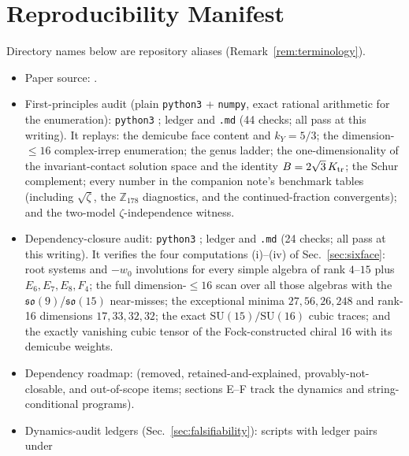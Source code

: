 \documentclass[
  aps,
  prd,
  preprint,
  nofootinbib,
  superscriptaddress,
  longbibliography
]{revtex4-2}
\newcommand{\SU}{\mathrm{SU}}
\begin{document}
\section{Reproducibility Manifest}
\label{sec:manifest}

Directory names below are repository aliases (Remark~\ref{rem:terminology}).

\begin{itemize}
\item Paper source: .
\item First-principles audit (plain \texttt{python3} + \texttt{numpy},
  exact rational arithmetic for the enumeration):
  \texttt{python3} ;
  ledger  and
  \texttt{.md} (44 checks; all pass at this writing).  It replays: the
  demicube face content and \(k_Y=5/3\); the dimension-\(\le16\)
  complex-irrep enumeration; the genus ladder; the one-dimensionality of
  the invariant-contact solution space and the identity
  \(B=2\sqrt3\,K_{\rm tr}\); the Schur complement; every number in the
  companion note's benchmark tables (including \(\sqrt\zeta\), the
  \(\mathbb Z_{178}\) diagnostics, and the continued-fraction convergents);
  and the two-model \(\zeta\)-independence witness.
\item Dependency-closure audit:
  \texttt{python3} ;
  ledger  and
  \texttt{.md} (24 checks; all pass at this writing).  It verifies the four
  computations (i)--(iv) of Sec.~\ref{sec:sixface}: root systems and
  \(-w_0\) involutions for every simple algebra of rank \(4\)--\(15\) plus
  \(E_6,E_7,E_8,F_4\); the full dimension-\(\le16\) scan over all those
  algebras with the \(\mathfrak{so}(9)\)/\(\mathfrak{so}(15)\) near-misses;
  the exceptional minima \(27,56,26,248\) and rank-16 dimensions
  \(17,33,32,32\); the exact \(\SU(15)/\SU(16)\) cubic traces; and the
  exactly vanishing cubic tensor of the Fock-constructed chiral \(16\) with
  its demicube weights.
\item Dependency roadmap:  (removed,
  retained-and-explained, provably-not-closable, and out-of-scope items;
  sections E--F track the dynamics and string-conditional programs).
\item Dynamics-audit ledgers (Sec.~\ref{sec:falsifiability}): scripts
   with ledger pairs under

\end{itemize}
\end{document}
